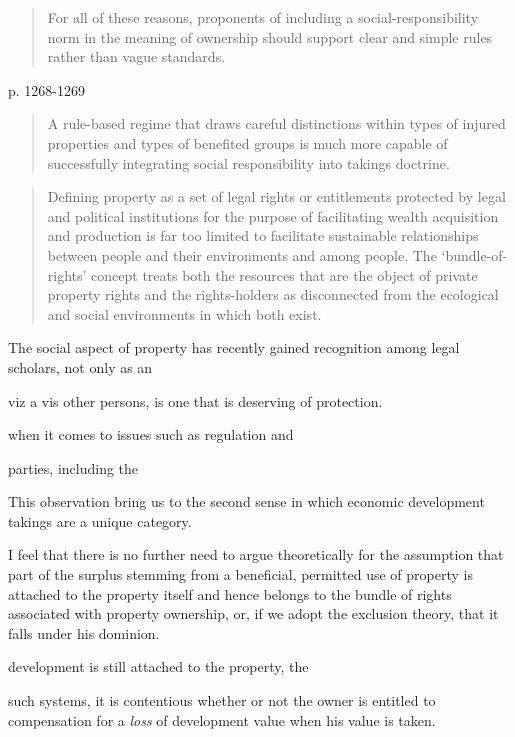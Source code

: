 \begin{quote}
For all of these reasons, proponents of including a social-responsibility norm in the meaning
of ownership should support clear and simple rules rather than vague standards.
\end{quote}p. 1268-1269

\begin{quote}
A rule-based regime that draws careful distinctions within types of injured properties and types
of benefited groups is much more capable of successfully integrating
social responsibility into takings doctrine.
\end{quote}

\begin{quote}
Defining property as a set of legal rights or entitlements protected by legal and 
political institutions for the purpose of facilitating wealth acquisition and production
is far too limited to facilitate sustainable relationships between people and their
environments and among people.  The ‘bundle-of-rights’ concept treats both the
resources that are the object of private property rights and the rights-holders as
disconnected from the ecological and social environments in which both exist.
\end{quote}




The social aspect of property has recently gained recognition among legal scholars, not only as an

viz a vis other persons, is one that is deserving of protection.




 when it comes to issues such as regulation and 

parties, including the 

This observation bring us to the second sense in which economic development takings are a unique category. 


I feel that there is no further need to argue theoretically for the assumption that part of the surplus stemming from a beneficial, permitted use of property is attached to the property itself and hence belongs to the bundle of rights associated with property ownership, or, if we adopt the exclusion theory, that it falls under his dominion.




development is still attached to the property, the 


such systems, it is contentious whether or not the owner is entitled to compensation for a {\it loss} of development value when his value is taken. 


